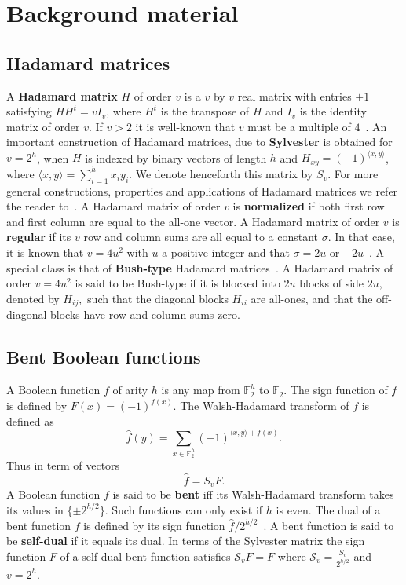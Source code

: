 \documentclass[12pt]{article}
\newcommand{\F}{\mathbb{F}}
\begin{document}
\section{Background material}
\label{sec:back}

\subsection{Hadamard matrices}
A {\bf Hadamard matrix} $H$ of order $v$ is a $v$ by $v$ real matrix with entries $\pm 1$ satisfying $HH^{t}=vI_{v}$, where $H^{t}$ is the transpose of $H$ and $I_{v}$ is the identity matrix of order $v$. If $v>2$ it is well-known that $v$ must be a multiple of $4$~\cite{MWS}.
An important construction of Hadamard matrices, due to {\bf Sylvester} is obtained for $v=2^h$, when $H$ is indexed by binary vectors of length $h$ and $H_{xy}=(-1)^{\langle x,y\rangle}$,
where ${\langle x,y\rangle}=\sum\limits_{i=1}^hx_iy_i$. We denote henceforth  this matrix by $S_v$. For more general constructions, properties and applications of Hadamard matrices we refer the reader to~\cite{Horadam:2007}.
A Hadamard matrix of order $v$ is {\bf normalized} if both first row and first column are equal to the all-one vector.
A Hadamard matrix of order $v$ is {\bf regular} if its $v$ row and column sums are all equal to a constant $\sigma$. In that case, it is known that $v=4u^2$ with $u$ a positive integer and that
$\sigma=2u$ or $-2u$~\cite{WSW:72}. A special class is that of {\bf Bush-type} Hadamard matrices~\cite{Bush:71}. A Hadamard matrix of order $v=4u^2$ is said to be { Bush-type}
if it is blocked into $2u$ blocks of side $2u,$
denoted by $H_{ij},$ such that the diagonal blocks $H_{ii}$ are all-ones, and that the off-diagonal blocks have row and column sums zero.
\subsection{Bent Boolean functions}
A Boolean function $f$ of arity $h$ is any map from $\F_2^h$ to $\F_2$.
The sign function of $f$ is defined by $F(x)=(-1)^{f(x)}$.
The Walsh-Hadamard transform of $f$ is defined as
$$ \widehat{f}(y)=\sum_{x \in \F_2^h} (-1)^{{\langle x,y\rangle}+f(x)}. $$
Thus in term of vectors $$ \widehat{f}=S_v F. $$
A Boolean function $f$ is said to be {\bf bent} iff its Walsh-Hadamard transform takes its values in $\{ \pm 2^{h/2}\}$. Such functions can only exist if $h$ is even.
The dual of a bent function $f$ is defined by its sign function $ \widehat{f}/2^{h/2}$~\cite{CDPS:2010}.
A bent function is said to be {\bf self-dual} if it equals its dual.
In terms of the Sylvester matrix the sign function $F$ of a self-dual bent function satisfies $\mathcal{S}_v F=F$ where $\mathcal{S}_v=\frac{S_v}{2^{h/2}}$ and $v=2^h$.
\end{document}
